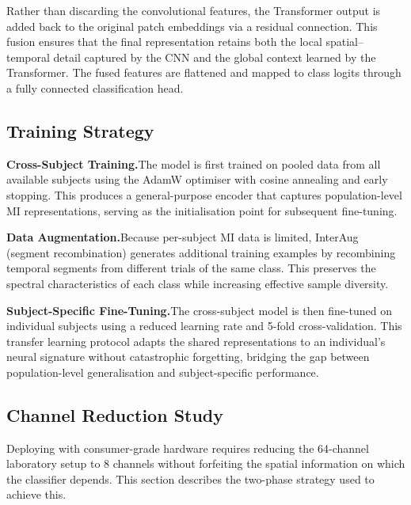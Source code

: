 \documentclass[12pt, a4paper]{article}
\begin{document}
Rather than discarding the convolutional features, the Transformer output is added back to the original patch embeddings via a residual connection. This fusion ensures that the final representation retains both the local spatial--temporal detail captured by the CNN and the global context learned by the Transformer. The fused features are flattened and mapped to class logits through a fully connected classification head.

\subsection{Training Strategy}

\textbf{Cross-Subject Training.}\quad The model is first trained on pooled data from all available subjects using the AdamW optimiser with cosine annealing and early stopping. This produces a general-purpose encoder that captures population-level MI representations, serving as the initialisation point for subsequent fine-tuning.

\textbf{Data Augmentation.}\quad Because per-subject MI data is limited, InterAug (segment recombination) generates additional training examples by recombining temporal segments from different trials of the same class. This preserves the spectral characteristics of each class while increasing effective sample diversity.

\textbf{Subject-Specific Fine-Tuning.}\quad The cross-subject model is then fine-tuned on individual subjects using a reduced learning rate and 5-fold cross-validation. This transfer learning protocol adapts the shared representations to an individual's neural signature without catastrophic forgetting, bridging the gap between population-level generalisation and subject-specific performance.

\subsection{Channel Reduction Study}

Deploying with consumer-grade hardware requires reducing the 64-channel laboratory setup to 8 channels without forfeiting the spatial information on which the classifier depends. This section describes the two-phase strategy used to achieve this.
\end{document}
